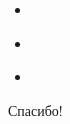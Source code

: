 \documentclass{beamer}
\begin{document}
\begin{frame}{}
\begin{itemize}
	\item 
	\medskip
\end{itemize}
\end{frame}

\begin{frame}{}
\begin{itemize}
	\item 
	\medskip
\end{itemize}
\end{frame}

\begin{frame}{}
\begin{itemize}
	\item 
	\medskip
\end{itemize}
\end{frame}




\begin{frame}{}
    \thispagestyle{empty}
    \begin{center}
        {\large Спасибо!}
    \end{center}
\end{frame}
\end{document}
